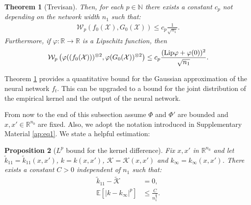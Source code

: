 \documentclass{article}
\newtheorem{thm}{Theorem}[section]
\newtheorem{prop}[thm]{Proposition}
\theoremstyle{definition}
\theoremstyle{remark}
\numberwithin{equation}{section}
\newcommand{\X}{\mathcal{X}}
\newcommand{\R}{\mathbb{R}}
\newcommand{\N}{\mathbb{N}}
\newcommand{\E}{\mathbb{E}}
\newcommand{\p}{\varphi}
\begin{document}
\begin{thm}[Trevisan]
    \label{thm:trevisanoriginal}
    Then, for each $p \in \N$ there exists a constant $c_p$ not depending on the network width $n_1$ such that:
    \begin{align}
        \mathcal W_p(f_0(\X), G_0(\X)) \le c_p \frac{1}{\sqrt{n_1}}.
    \end{align}
    Furthermore, if $\p \colon \R \to \R$ is a Lipschitz function, then
    \begin{align}
        \mathcal W_p\left(\p((f_0(\X)))^{\otimes 2}, \p(G_0(\X))^{\otimes 2}\right) \le c_p \frac{(\textup{Lip}\p + \p(0))^2}{\sqrt{n_1}}.
    \end{align}
\end{thm}

Theorem \ref{thm:trevisanoriginal} provides a quantitative bound for the Gaussian approximation of the neural network $f_t$.
This can be upgraded to a bound for the joint distribution of the empirical kernel and the output of the neural network.

From now to the end of this subsection assume $\Phi$ and $\Phi'$ are bounded and $x,x'\in \R^{n_0}$ are fixed.
Also, we adopt the notation introduced in Supplementary Material \ref{ap:eq1}.
We state a helpful estimation:

\begin{prop}[$L^p$ bound for the kernel difference]
    \label{prop:kernelp}
    Fix $x,x'$ in $\R^{n_0}$ and let $\tilde k_{11} = \tilde k_{11}(x,x')$, $k=k(x,x')$, $\mathcal K=\mathcal K(x,x')$ and $k_\infty = k_\infty(x,x')$.
    There exists a constant $C > 0$ independent of $n_1$ such that:
    \begin{align}
        \tilde k_{11}-\tilde{\mathcal K} &= 0, \\
        \E[\vert k-k_\infty\vert^p] &\le \frac{C}{n_1^\frac{p}{2}}.
    \end{align}
\end{prop}
\end{document}
